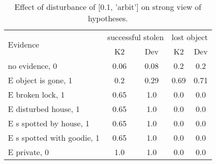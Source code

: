 \begin{table}\begin{tabular}{l|cc|cc}\toprule\multirow{2}{*}{Evidence} & \multicolumn{2}{c}{successful stolen}& \multicolumn{2}{c}{lost object}\\& {K2} & {Dev}& {K2} & {Dev}\\\midrule
no evidence, 0 & 0.06&0.08&0.2&0.2\\E object is gone, 1 & \cellcolor{Bittersweet}0.2&\cellcolor{Bittersweet}0.29&0.69&0.71\\E broken lock, 1 & \cellcolor{Bittersweet}0.65&\cellcolor{Bittersweet}1.0&0.0&0.0\\E disturbed house, 1 & \cellcolor{Bittersweet}0.65&\cellcolor{Bittersweet}1.0&0.0&0.0\\E s spotted by house, 1 & \cellcolor{Bittersweet}0.65&\cellcolor{Bittersweet}1.0&0.0&0.0\\E s spotted with goodie, 1 & \cellcolor{Bittersweet}0.65&\cellcolor{Bittersweet}1.0&0.0&0.0\\E private, 0 & 1.0&1.0&0.0&0.0\\\bottomrule\end{tabular}\caption{Effect of disturbance of [0.1, 'arbit'] on strong view of hypotheses.}\end{table}